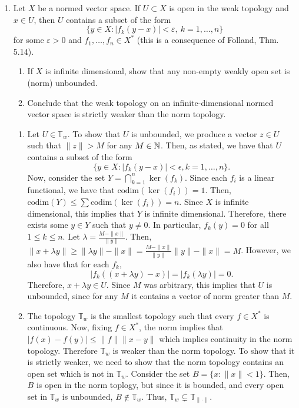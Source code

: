 \documentclass[11pt]{article}
\begin{document}
\begin{enumerate}[label=\arabic*.]
\vspace{1em}

\item Let $X$ be a normed vector space. If $U \subset X$ is open in the weak topology and $x \in U$, then $U$ contains a subset of the form
\[
\{y \in X : |f_k(y-x)| < \varepsilon,\ k=1,\dots,n\}
\]
for some $\varepsilon > 0$ and $f_1,\dots,f_n \in X^*$ (this is a consequence of Folland, Thm. 5.14).
\begin{enumerate}[label=(\alph*)]
\item If $X$ is infinite dimensional, show that any non-empty weakly open set is (norm) unbounded.
\item Conclude that the weak topology on an infinite-dimensional normed vector space is strictly weaker than the norm topology.
\end{enumerate}

\vspace{1em}

\begin{enumerate}
    \item Let $U \in \mathbb{T}_{w}$.
        To show that $U$ is unbounded, we produce a vector $z \in U$ such that $\|z\| > M$ for any $M \in \mathbb{N}$.
        Then, as stated, we have that $U$ contains a subset of the form
        \[
        \{y \in X : |f_k(y - x)| < \epsilon, k=1, \ldots, n\} 
        .\] 
        Now, consider the set $Y = \bigcap_{k = 1}^{n} \ker(f_k)$.
        Since each $f_i$ is a linear functional, we have that $\text{codim}(\ker(f_i)) = 1$.
        Then, $\text{codim}(Y) \leq \sum \text{codim}(\ker(f_i)) = n$.
        Since $X$ is infinite dimensional, this implies that $Y$ is infinite dimensional.
        Therefore, there exists some $y \in Y$ such that $y \neq 0$.
        In particular, $f_k(y) = 0$ for all $1 \leq k \leq n$.
        Let $\lambda = \frac{M - \|x\|}{\|y\|}$.
        Then, $\|x + \lambda y\| \geq \| \lambda y\| - \|x\| = \frac{M - \|x\|}{\|y\|} \|y\|- \|x\| = M$.
        However, we also have that for each $f_k$,
        \[
        |f_k((x + \lambda y) - x)| = |f_k(\lambda y)| = 0
        .\] 
        Therefore, $x + \lambda y \in U$.
        Since $M$ was arbitrary, this implies that $U$ is unbounded, since for any $M$ it contains a vector of norm greater than $M$.

    \item The topology $\mathbb{T}_{w}$ is the smallest topology such that every $f \in X^{*}$ is continuous.
        Now, fixing $f \in X^{*}$, the norm implies that $|f(x) - f(y)| \leq \|f\|\|x - y\|$ which implies continuity in the norm topology.
        Therefore $\mathbb{T}_{w}$ is weaker than the norm topology.
        To show that it is strictly weaker, we need to show that the norm topology contains an open set which is not in $\mathbb{T}_{w}$.
        Consider the set $B = \{x : \|x\| < 1\} $.
        Then, $B$ is open in the norm toplogy, but since it is bounded, and every open set in $\mathbb{T}_{w}$ is unbounded, $B \not\in  \mathbb{T}_{w}$. Thus, $\mathbb{T}_{w} \subsetneq \mathbb{T}_{\|\cdot \|}$.
\end{enumerate}


\end{enumerate}
\end{document}
